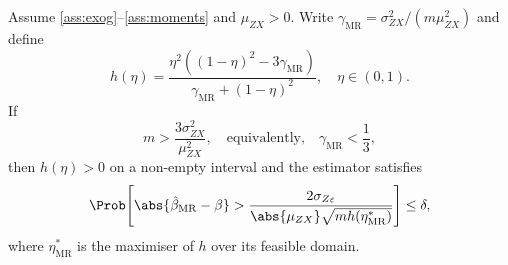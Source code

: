 \begin{theorem}
\label{thm:mor_cantelli}
    Assume \ref{ass:exog}--\ref{ass:moments} and $\mu_{ZX}>0$. Write $\gamma_{\mathrm{MR}} = \sigma_{ZX}^2/(m\mu_{ZX}^2)$ and define
    \begin{equation}
    \label{eq:h_eta_mor}
        h(\eta) = \frac{\eta^2((1-\eta)^2 - 3\gamma_\mathrm{MR})}{\gamma_\mathrm{MR}+(1-\eta)^2},
        \quad \eta\in(0,1).
    \end{equation}
    If
    \begin{equation}
    \label{eq:mor_cantelli_strength}
        m > \frac{3\sigma_{ZX}^2}{\mu_{ZX}^2}, \quad\text{equivalently,}\quad \gamma_{\mathrm{MR}} < \frac{1}{3},
    \end{equation}
    then $h(\eta)>0$ on a non-empty interval and the estimator satisfies
    \begin{equation}
    \label{eq:mor_cantelli_bound}
        \Prob\!\left[\abs{\hat{\beta}_{\mathrm{MR}} - \beta}
            > \frac{2\sigma_{Z\varepsilon}}{\abs{\mu_{ZX}}\sqrt{mh(\eta^*_{\mathrm{MR}})}}
            \right] \leq \delta,
    \end{equation}
    where $\eta^*_{\mathrm{MR}}$ is the maximiser of $h$ over its feasible domain.
\end{theorem}

